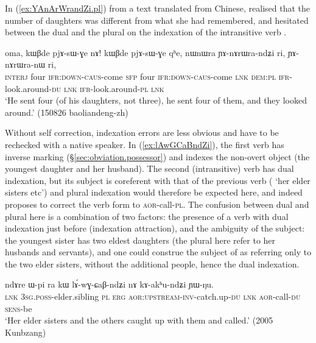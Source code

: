 In (\ref{ex:YAnArWrandZi.pl}) from a text translated from Chinese,  realised that the number of daughters was different from what she had  remembered, and hesitated between the dual and the plural on the indexation of the intransitive verb .

\begin{exe}
\ex \label{ex:YAnArWrandZi.pl}
\gll oma, kɯβde pjɤ-sɯ-ɣe nɤ! kɯβde pjɤ-sɯ-ɣe qʰe, nɯnɯra ɲɤ-nɤrɯra-ndʑi ri, ɲɤ-nɤrɯra-nɯ ri, \\
\textsc{interj} four \textsc{ifr}:\textsc{down}-\textsc{caus}-come \textsc{sfp} four \textsc{ifr}:\textsc{down}-\textsc{caus}-come \textsc{lnk} \textsc{dem}:\textsc{pl} \textsc{ifr}-look.around-\textsc{du} \textsc{lnk} \textsc{ifr}-look.around-\textsc{pl} \textsc{lnk} \\
\glt `He sent four (of his daughters, not three), he sent four of them, and they looked around.' (150826 baoliandeng-zh) 
\end{exe} 

Without self correction, indexation errors are less obvious and have to be rechecked with a native speaker. In (\ref{ex:lAwGCaBndZi}), the first verb  has inverse marking (§\ref{sec:obviation.possessor}) and indexes the non-overt object (the youngest daughter and her husband). The second (intransitive) verb has dual indexation, but its subject is coreferent with that of the previous verb ( `her elder sisters etc') and plural indexation would therefore be expected here, and  indeed proposes to correct the verb form to  \textsc{aor}-call-\textsc{pl}. The confusion between dual and plural here is a combination of two factors: the presence of a verb with dual indexation just before (indexation attraction), and the ambiguity of the subject: the youngest sister has two eldest daughters (the plural here refer to her husbands and servants), and one could construe the subject of  as referring only to the two elder sisters, without the additional people, hence the dual indexation.

\begin{exe}
\ex \label{ex:lAwGCaBndZi}
\gll  ndɤre ɯ-pi ra kɯ lɤ́-wɣ-ɕaβ-ndʑi nɤ kɤ-akʰu-ndʑi ɲɯ-ŋu. \\
\textsc{lnk} \textsc{3sg}.\textsc{poss}-elder.sibling \textsc{pl} \textsc{erg} \textsc{aor}:\textsc{upstream}-\textsc{inv}-catch.up-\textsc{du} \textsc{lnk} \textsc{aor}-call-\textsc{du} \textsc{sens}-be \\
\glt `Her elder sisters and the others caught up with them and called.' (2005 Kunbzang)
\end{exe} 

